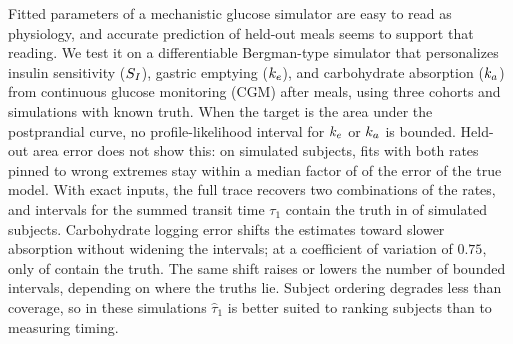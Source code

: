 Fitted parameters of a mechanistic glucose simulator are easy to read as physiology, and accurate prediction of held-out meals seems to support that reading.
We test it on a differentiable Bergman-type simulator that personalizes insulin sensitivity ($S_I$), gastric emptying ($k_e$), and carbohydrate absorption ($k_a$) from continuous glucose monitoring (CGM) after meals, using three cohorts and simulations with known truth.
When the target is the area under the postprandial curve, no profile-likelihood interval for $k_e$ or $k_a$ is bounded.
Held-out area error does not show this: on simulated subjects, fits with both rates pinned to wrong extremes stay within a median factor of \resNegZeroFastRefitIauc{} of the error of the true model.
With exact inputs, the full trace recovers two combinations of the rates, and intervals for the summed transit time $\tau_1$ contain the truth in \resCRandZeroTauCover{} of \resCRandZeroTauN{} simulated subjects.
Carbohydrate logging error shifts the estimates toward slower absorption without widening the intervals; at a coefficient of variation of $0.75$, only \resCRandThreeQuarterTauCover{} of \resCRandThreeQuarterTauN{} contain the truth.
The same shift raises or lowers the number of bounded intervals, depending on where the truths lie.
Subject ordering degrades less than coverage, so in these simulations $\hat\tau_1$ is better suited to ranking subjects than to measuring timing.
